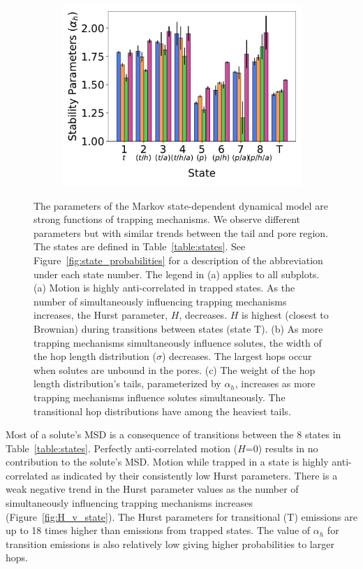 \documentclass[journal=jctcce,manuscript=article]{achemso}
\begin{document}
\begin{figure}
\begin{subfigure}{0.325\textwidth}
  \includegraphics[width=\textwidth]{alpha_v_state.pdf}
  \caption{}\label{fig:alpha_v_state}
  \end{subfigure}
  \caption{The parameters of the Markov state-dependent dynamical model
      are strong functions of trapping mechanisms. We observe different 
      parameters but with similar trends between the tail and pore region. 
      The states are defined in Table~\ref{table:states}. See 
      Figure~\ref{fig:state_probabilities} for a description of the 
      abbreviation under each state number. The legend in (a) applies to
      all subplots. (a) Motion is highly anti-correlated in trapped states. 
      As the number of simultaneously influencing trapping mechanisms 
      increases, the Hurst parameter, $H$, decreases. $H$ is highest 
      (closest to Brownian) during transitions between states (state T). 
      (b) As more trapping mechanisms simultaneously influence solutes,
	  the width of the hop length distribution ($\sigma$) decreases. The
	  largest hops occur when solutes are unbound in the pores. (c) The
	  weight of the hop length distribution's tails, parameterized by
	  $\alpha_h$, increases as more trapping mechanisms influence solutes
	  simultaneously. The transitional hop distributions have among the
	  heaviest tails.}\label{fig:msddm_parameters}
  \end{figure}

  Most of a solute's MSD is a consequence of transitions between the 8 states
  in Table~\ref{table:states}. Perfectly anti-correlated motion ($H$=0) results
  in no contribution to the solute's MSD. Motion while trapped in a state is
  highly anti-correlated as indicated by their consistently low Hurst
  parameters. There is a weak negative trend in the Hurst parameter values as
  the number of simultaneously influencing trapping mechanisms increases
  (Figure~\ref{fig:H_v_state}). The Hurst parameters for transitional (T)
  emissions are up to 18 times higher than emissions from trapped states. The
  value of $\alpha_h$ for transition emissions is also relatively low giving
  higher probabilities to larger hops.
  
\end{document}
